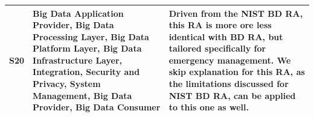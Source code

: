 \documentclass[review]{elsarticle}
\begin{document}
\begin{table}[h!]
\begin{tabular}{ |p{0.5cm}|p{3cm}|p{7.5cm}| }
        \hline
        S20 & Big Data Application Provider, Big Data Processing Layer, Big Data Platform Layer, Big Data Infrastructure Layer, Integration, Security and Privacy, System Management, Big Data Provider, Big Data Consumer & Driven from the NIST BD RA, this RA is more ore less identical with BD RA, but tailored specifically for emergency management. We skip explanation for this RA, as the limitations discussed for NIST BD RA, can be applied to this one as well. \\
        \hline
    \end{tabular}
    \end{table}





\end{document}
